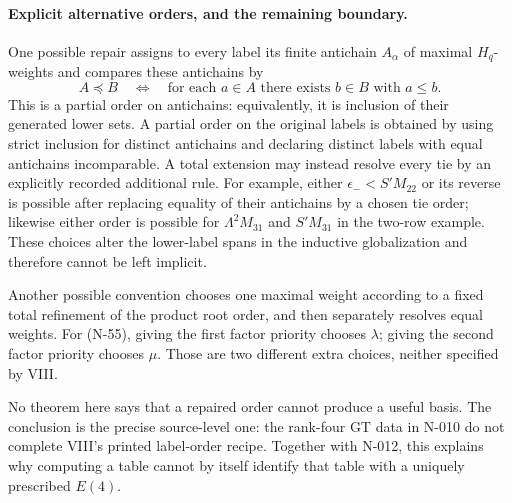 \paragraph{Explicit alternative orders, and the remaining boundary.}
One possible repair assigns to every label its finite
antichain $A_\alpha$ of maximal $H_q$-weights and compares
these antichains by
\[
 A\preceq B\quad\Longleftrightarrow\quad
 \text{for each }a\in A\text{ there exists }b\in B
                       \text{ with }a\le b.
 \tag{N-59}
\]
This is a partial order on antichains: equivalently, it is
inclusion of their generated lower sets.  A partial order on
the original labels is obtained by using strict inclusion
for distinct antichains and declaring distinct labels with
equal antichains incomparable.  A total extension may instead
resolve every tie by an explicitly recorded additional rule.
For example, either $\epsilon_-<S'M_{22}$ or its reverse
is possible after replacing equality of their antichains
by a chosen tie order; likewise either order is possible
for $\Lambda^2M_{31}$ and $S'M_{31}$ in the two-row example.
These choices alter the lower-label spans in the inductive
globalization and therefore cannot be left implicit.

Another possible convention chooses one maximal weight
according to a fixed total refinement of the product root
order, and then separately resolves equal weights.  For
(N-55), giving the first factor priority chooses $\lambda$;
giving the second factor priority chooses $\mu$.  Those are
two different extra choices, neither specified by VIII.

No theorem here says that a repaired order cannot produce a
useful basis.  The conclusion is the precise source-level
one: the rank-four GT data in N-010 do not complete VIII's
printed label-order recipe.  Together with N-012, this
explains why computing a table cannot by itself identify
that table with a uniquely prescribed $E(4)$.
